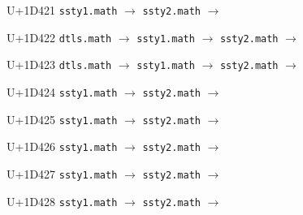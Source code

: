 \documentclass{article}
\begin{document}
\begin{substitutions}
\goodbreak

U+1D421  \linebreak
    \texttt{ssty1.math} $\to$  \linebreak
    \texttt{ssty2.math} $\to$  

\goodbreak

U+1D422  \linebreak
    \texttt{dtls.math} $\to$  \linebreak
    \texttt{ssty1.math} $\to$  \linebreak
    \texttt{ssty2.math} $\to$  

\goodbreak

U+1D423  \linebreak
    \texttt{dtls.math} $\to$  \linebreak
    \texttt{ssty1.math} $\to$  \linebreak
    \texttt{ssty2.math} $\to$  

\goodbreak

U+1D424  \linebreak
    \texttt{ssty1.math} $\to$  \linebreak
    \texttt{ssty2.math} $\to$  

\goodbreak

U+1D425  \linebreak
    \texttt{ssty1.math} $\to$  \linebreak
    \texttt{ssty2.math} $\to$  

\goodbreak

U+1D426  \linebreak
    \texttt{ssty1.math} $\to$  \linebreak
    \texttt{ssty2.math} $\to$  

\goodbreak

U+1D427  \linebreak
    \texttt{ssty1.math} $\to$  \linebreak
    \texttt{ssty2.math} $\to$  

\goodbreak

U+1D428  \linebreak
    \texttt{ssty1.math} $\to$  \linebreak
    \texttt{ssty2.math} $\to$  


\end{substitutions}
\end{document}
